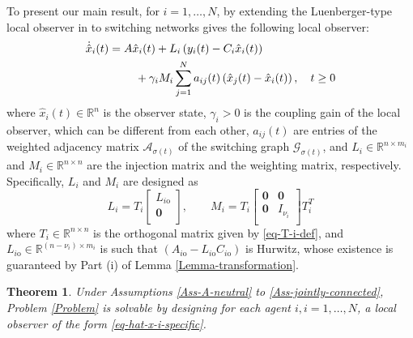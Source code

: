 \documentclass[twocolumn]{autart}
\newcommand{\RR}{\mathbb{R}}
\newtheorem{Theorem}{Theorem}
\begin{document}
To present our main result,  for $i=1,\ldots,N$,  by extending the Luenberger-type local observer in \cite{KimShim20} to switching networks gives
the following local observer:
\begin{align}\label{eq-hat-x-i-specific}
    \dot{\hat{x}}_{i}(t)&=A\hat{x}_{i}(t)+L_{i}\left(y_{i}(t)-C_{i}\hat{x}_{i}(t)\right) \notag\\
    &\qquad \  + \gamma_{i} M_{i}\sum_{j=1}^{N}a_{ij}(t)\left(\hat{x}_{j}(t)-\hat{x}_{i}(t)\right), \quad t\ge 0
\end{align}
where $\hat{x}_{i}(t)\in \RR^{n}$ is the observer state,
$\gamma_{i}>0$ is the coupling gain of the local observer, which can be different from each other,
$a_{ij}(t)$ are entries of the weighted adjacency matrix $\mathcal{A}_{\sigma(t)}$ of the switching graph $\mathcal{G}_{\sigma(t)}$,
and $L_{i} \in \RR^{n \times m_{i}}$ and $M_{i}\in \RR^{n \times n}$ are the injection matrix and the weighting matrix, respectively.
Specifically,  $L_{i}$ and $M_{i}$ are designed as
\begin{equation}\label{eq-L-i-M-i-def}
   L_{i}=T_{i}\left[
                 \begin{array}{c}
                   L_{i\text{o}} \\
                   \mathbf{0} \\
                 \end{array}
               \right], \qquad M_{i}=T_{i} \left[
                                             \begin{array}{cc}
                                               \mathbf{0} & \mathbf{0} \\
                                               \mathbf{0} & I_{\nu_{i}} \\
                                             \end{array}
                                           \right]T_{i}^{T}
\end{equation}
where $T_{i}\in \RR^{n\times n}$ is the orthogonal matrix given by \eqref{eq-T-i-def},
and $L_{i\text{o}} \in \RR^{(n-\nu_{i})\times m_{i}}$ is such that
$(A_{i\text{o}}-L_{i\text{o}}C_{i\text{o}})$ is Hurwitz,
whose existence is guaranteed by Part (i) of Lemma \ref{Lemma-transformation}.





\begin{Theorem}\label{Theorem}
  Under Assumptions \ref{Ass-A-neutral} to \ref{Ass-jointly-connected},
Problem \ref{Problem} is solvable by designing for each agent $i, i=1,\ldots,N$, a local observer of the form \eqref{eq-hat-x-i-specific}.
\end{Theorem}
\end{document}
